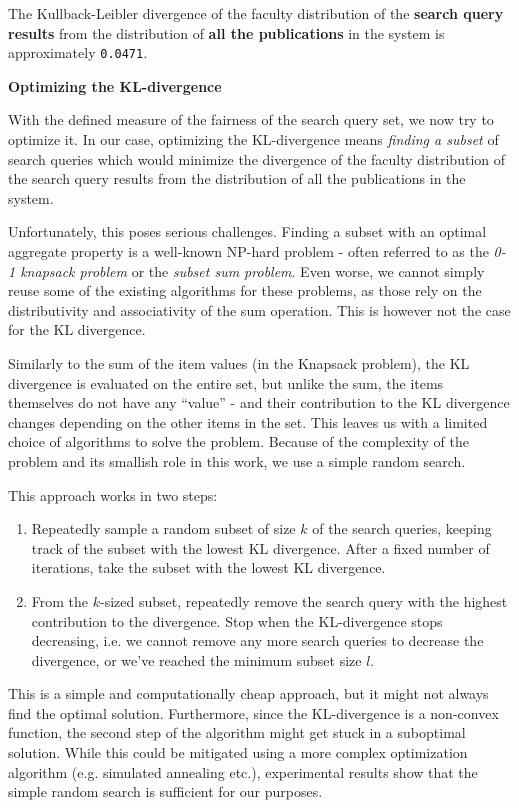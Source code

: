 The Kullback-Leibler divergence of the faculty distribution of the \textbf{search query results} from the distribution of \textbf{all the publications} in the system is approximately \texttt{0.0471}.

\textbf{Optimizing the KL-divergence}

With the defined measure of the fairness of the search query set, we now try to optimize it.
In our case, optimizing the KL-divergence means \textit{finding a subset} of search queries which would minimize the divergence of the faculty distribution of the search query results from the distribution of all the publications in the system.

Unfortunately, this poses serious challenges. 
Finding a subset with an optimal aggregate property is a well-known NP-hard problem - often referred to as the \textit{0-1 knapsack problem} or the \textit{subset sum problem}.
Even worse, we cannot simply reuse some of the existing algorithms for these problems, as those rely on the distributivity and associativity of the sum operation. 
This is however not the case for the KL divergence.

Similarly to the sum of the item values (in the Knapsack problem), the KL divergence is evaluated on the entire set, but unlike the sum, the items themselves do not have any “value” - and their contribution to the KL divergence changes depending on the other items in the set. 
This leaves us with a limited choice of algorithms to solve the problem. 
Because of the complexity of the problem and its smallish role in this work, we use a simple random search. 

This approach works in two steps:

\begin{enumerate}
    \item Repeatedly sample a random subset of size $k$ of the search queries, keeping track of the subset with the lowest KL divergence.
After a fixed number of iterations, take the subset with the lowest KL divergence.
    \item From the $k$-sized subset, repeatedly remove the search query with the highest contribution to the divergence.
Stop when the KL-divergence stops decreasing, i.e. we cannot remove any more search queries to decrease the divergence, or we've reached the minimum subset size $l$.
\end{enumerate}

This is a simple and computationally cheap approach, but it might not always find the optimal solution.
Furthermore, since the KL-divergence is a non-convex function, the second step of the algorithm might get stuck in a suboptimal solution.
While this could be mitigated using a more complex optimization algorithm (e.g. simulated annealing etc.), experimental results show that the simple random search is sufficient for our purposes.

